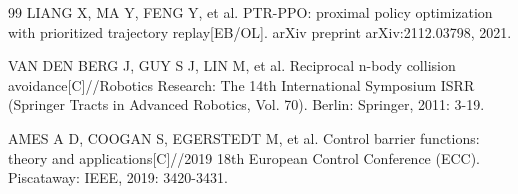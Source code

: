 \documentclass[12pt,a4paper,UTF8]{ctexart}
\begin{document}
\begin{thebibliography}{99}
 LIANG X, MA Y, FENG Y, et al. PTR-PPO: proximal policy optimization with prioritized trajectory replay[EB/OL]. arXiv preprint arXiv:2112.03798, 2021.

 VAN DEN BERG J, GUY S J, LIN M, et al. Reciprocal n-body collision avoidance[C]//Robotics Research: The 14th International Symposium ISRR (Springer Tracts in Advanced Robotics, Vol. 70). Berlin: Springer, 2011: 3-19.

 AMES A D, COOGAN S, EGERSTEDT M, et al. Control barrier functions: theory and applications[C]//2019 18th European Control Conference (ECC). Piscataway: IEEE, 2019: 3420-3431.

\end{thebibliography}
\end{document}

